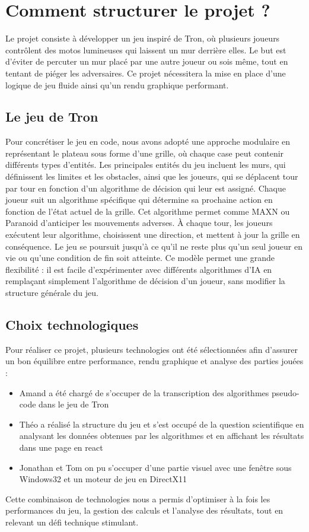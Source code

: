\section{Comment structurer le projet ?}
Le projet consiste à développer un jeu inspiré de Tron, où plusieurs joueurs contrôlent des motos lumineuses qui laissent un mur derrière elles. Le but est d'éviter de percuter un mur placé par une autre joueur ou sois même, tout en tentant de piéger les adversaires. Ce projet nécessitera la mise en place d’une logique de jeu fluide ainsi qu’un rendu graphique performant.

\subsection{Le jeu de Tron}
Pour concrétiser le jeu en code, nous avons adopté une approche modulaire en représentant le plateau sous forme d’une grille, où chaque case peut contenir différents types d’entités. Les principales entités du jeu incluent les murs, qui définissent les limites et les obstacles, ainsi que les joueurs, qui se déplacent tour par tour en fonction d’un algorithme de décision qui leur est assigné.
Chaque joueur suit un algorithme spécifique qui détermine sa prochaine action en fonction de l’état actuel de la grille. Cet algorithme permet comme MAXN ou Paranoid d’anticiper les mouvements adverses. À chaque tour, les joueurs exécutent leur algorithme, choisissent une direction, et mettent à jour la grille en conséquence. Le jeu se poursuit jusqu’à ce qu’il ne reste plus qu’un seul joueur en vie ou qu’une condition de fin soit atteinte.
Ce modèle permet une grande flexibilité : il est facile d’expérimenter avec différents algorithmes d’IA en remplaçant simplement l’algorithme de décision d’un joueur, sans modifier la structure générale du jeu.

\subsection{Choix technologiques}
Pour réaliser ce projet, plusieurs technologies ont été sélectionnées afin d’assurer un bon équilibre entre performance, rendu graphique et analyse des parties jouées :
\begin{itemize}
    \item Amand a été chargé de s'occuper de la transcription des algorithmes pseudo-code dans le jeu de Tron
    \item Théo a réalisé la structure du jeu et s'est occupé de la question scientifique en analysant les données obtenues par les algorithmes et en affichant les résultats dans une page en react
    \item Jonathan et Tom on pu s'occuper d'une partie visuel avec une fenêtre sous Windows32 et un moteur de jeu en DirectX11
\end{itemize}
Cette combinaison de technologies nous a permis d’optimiser à la fois les performances du jeu, la gestion des calculs et l’analyse des résultats, tout en relevant un défi technique stimulant.

